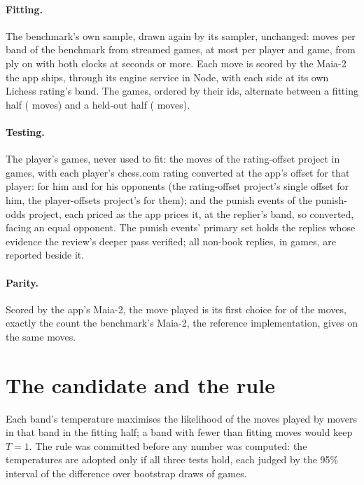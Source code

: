 \documentclass[11pt]{article}
\begin{document}
\paragraph{Fitting.} The benchmark's own sample, drawn again by its sampler, unchanged:
\BenchPerBand{} moves per band of the benchmark from \BenchSeen{} streamed games, at most
\BenchPerGame{} per player and game, from ply \BenchMinPly{} on with both clocks at
\BenchMinClock{} seconds or more. Each move is scored by the Maia-2 the app ships, through its engine service in Node, with
each side at its own Lichess rating's band. The \LichessGames{} games, ordered by their ids,
alternate between a fitting half (\FitMoves{} moves) and a held-out half (\HeldMoves{} moves).

\paragraph{Testing.} The player's games, never used to fit: the \HisMoves{} moves of the
rating-offset project in \HisGames{} games, with each player's chess.com rating converted at the
app's offset for that player: \PlayerOffset{} for him and \OpponentOffset{} for his opponents
(the rating-offset project's single offset for him, the player-offsets project's for them); and
the punish events of the punish-odds project, each priced as the app prices it, at the replier's
band, so converted, facing an equal opponent. The punish events'
primary set holds the \PunishExact{} replies whose evidence the review's deeper pass verified;
all \PunishAll{} non-book replies, in \PunishGames{} games, are reported beside it.

\paragraph{Parity.} Scored by the app's Maia-2, the move played is its first choice for
\FirstChoice{} of the \LichessMoves{} moves, exactly the count the benchmark's Maia-2, the
reference implementation, gives on the same moves.

\section{The candidate and the rule}

Each band's temperature maximises the likelihood of the moves played by movers in that band in
the fitting half; a band with fewer than \MinFitMoves{} fitting moves would keep $T = 1$. The rule
was committed before any number was computed: the temperatures are adopted only if all three
tests hold, each judged by the 95\% interval of the difference over \Draws{} bootstrap draws of
games.
\end{document}
